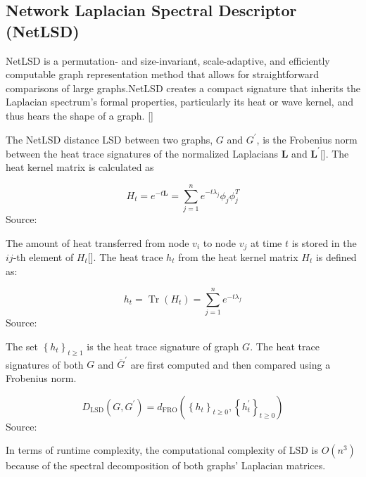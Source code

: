 \subsection{Network Laplacian Spectral Descriptor (NetLSD)}
NetLSD is a permutation- and size-invariant, scale-adaptive, and efficiently computable graph representation method that allows for straightforward comparisons of large graphs.NetLSD creates a compact signature that inherits the Laplacian spectrum's formal properties, particularly its heat or wave kernel, and thus hears the shape of a graph. [\cite{Tsitsulin:2018}]

The NetLSD distance LSD between two graphs, $G$ and $G^{\prime}$, is the Frobenius norm between the heat trace signatures of the normalized Laplacians $\mathbf{L}$ and $\mathbf{L}^{\prime}$[\cite{Tsitsulin:2018}]. The heat kernel matrix is calculated as

\begin{equation}
H_{t}=e^{-t \mathbf{L}}=\sum_{j=1}^{n} e^{-t \lambda_{j}} \phi_{j} \phi_{j}^{T}
\end{equation}
Source: \cite{Tsitsulin:2018}

The amount of heat transferred from node $v_{i}$ to node $v_{j}$ at time $t$ is stored in the $i j$-th element of $H_{t}$[\cite{Tsitsulin:2018}]. The heat trace $h_{t}$ from the heat kernel matrix $H_{t}$ is defined as:

\begin{equation}
h_{t}=\operatorname{Tr}\left(H_{t}\right)=\sum_{j=1}^{n} e^{-t \lambda_{f}}  
\end{equation}
Source: \cite{Tsitsulin:2018}

The set $\left\{h_{t}\right\}_{t \geq 1}$ is the heat trace signature of graph $G$. The heat trace signatures of both $G$ and $\bar{G}^{\prime}$ are first computed and then compared using a Frobenius norm.

\begin{equation}
D_{\mathrm{LSD}}\left(G, G^{\prime}\right)=d_{\mathrm{FRO}}\left(\left\{h_{t}\right\}_{t \geq 0},\left\{h_{t}^{\prime}\right\}_{t \geq 0}\right)
\end{equation}
Source: \cite{Tsitsulin:2018}

In terms of runtime complexity, the computational complexity of LSD is $O\left(n^{3}\right)$ because of the spectral decomposition of both graphs' Laplacian matrices.

